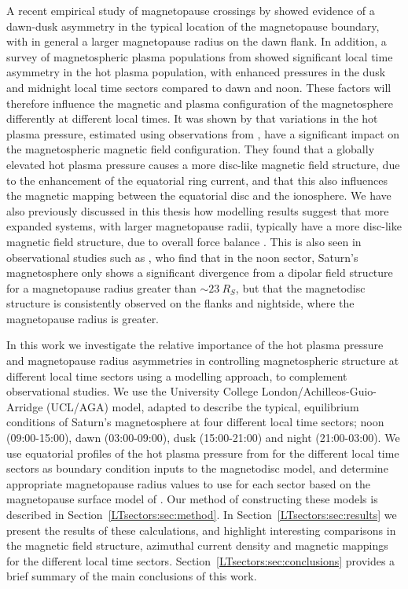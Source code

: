 A recent empirical study of magnetopause crossings by \citet{pilkington2015b} showed evidence of a dawn-dusk asymmetry in the typical location of the magnetopause boundary, with in general a larger magnetopause radius on the dawn flank. In addition, a survey of magnetospheric plasma populations from \citet{sergis2017} showed significant local time asymmetry in the hot plasma population, with enhanced pressures in the dusk and midnight local time sectors compared to dawn and noon. These factors will therefore influence the magnetic and plasma configuration of the magnetosphere differently at different local times.  It was shown by \citet{achilleos2010b} that variations in the hot plasma pressure, estimated using observations from \citet{sergis2007}, have a significant impact on the magnetospheric magnetic field configuration. They found that a globally elevated hot plasma pressure causes a more disc-like magnetic field structure, due to the enhancement of the equatorial ring current, and that this also influences the magnetic mapping between the equatorial disc and the ionosphere. We have also previously discussed in this thesis how modelling results suggest that more expanded systems, with larger magnetopause radii, typically have a more disc-like magnetic field structure, due to overall force balance \citep[e.g.][]{bunce2008, achilleos2010a,sorba2017}. This is also seen in observational studies such as \citet{arridge2008}, who find that in the noon sector, Saturn's magnetosphere only shows a significant divergence from a dipolar field structure for a magnetopause radius greater than ${\sim}\SI{23}{R_S}$, but that the magnetodisc structure is consistently observed on the flanks and nightside, where the magnetopause radius is greater.

In this work we investigate the relative importance of the hot plasma pressure and magnetopause radius asymmetries in controlling magnetospheric structure at different local time sectors using a modelling approach, to complement observational studies. We use the University College London/Achilleos-Guio-Arridge (UCL/AGA) model, adapted to describe the typical, equilibrium conditions of Saturn's magnetosphere at four different local time sectors; noon (09:00-15:00), dawn (03:00-09:00), dusk (15:00-21:00) and night (21:00-03:00). We use equatorial profiles of the hot plasma pressure from \citet{sergis2017} for the different local time sectors as boundary condition inputs to the magnetodisc model, and determine appropriate magnetopause radius values to use for each sector based on the magnetopause surface model of \citet{pilkington2015b}. Our method of constructing these models is described in Section~\ref{LTsectors:sec:method}. In Section~\ref{LTsectors:sec:results} we present the results of these calculations, and highlight interesting comparisons in the magnetic field structure, azimuthal current density and magnetic mappings for the different local time sectors. Section~\ref{LTsectors:sec:conclusions} provides a brief summary of the main conclusions of this work.

